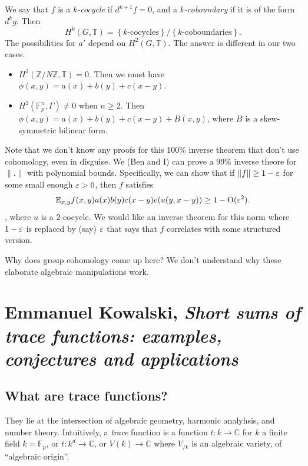 \documentclass[reqno]{amsart} 
\numberwithin{theorem}{section}
\numberwithin{equation}{section}
\begin{document}
We say that $f$ is a $k$\emph{-cocycle} if $d^{k + 1} f = 0$, and a $k$\emph{-coboundary} if it is of the form $d^k g$.  Then
\begin{equation*}
  H^k(G, \mathbb{T}) = \left\{ \text{$k$-cocycles} \right\} / \left\{\text{$k$-coboundaries} \right\}.
\end{equation*}
The possibilities for $a'$ depend on $H^2(G, \mathbb{T})$.  The answer is different in our two cases.
\begin{itemize}
\item $H^2(\mathbb{Z} / N \mathbb{Z}, \mathbb{T}) = 0$.  Then we must have $\phi(x, y) = a(x) + b(y) + c(x - y)$.
\item $H^2(\mathbb{F}_p^n, \Gamma) \neq 0$ when $n \geq 2$.  Then $\phi(x, y) = a(x) + b(y) + c(x - y) + B(x, y)$, where $B$ is a skew-symmetric bilinear form.
\end{itemize}
Note that we don't know any proofs for this 100\% inverse theorem that don't use cohomology, even in disguise.  We (Ben and I) can prove a 99\% inverse theore for $\lVert . \rVert$ with polynomial bounds.  Specifically, we can show that if $\lVert f \rVert \geq 1 - \varepsilon$ for some small enough $\varepsilon > 0$, then $f$ satisfies
\begin{equation*}
  \mathbb{E}_{x, y} f(x, y) a(x) b(y) c(x - y) e(u(y, x - y)) \geq 1 - \operatorname{O}(\varepsilon^2).
\end{equation*},
where $u$ is a $2$-cocycle.  We would like an inverse theorem for this norm where $1- \varepsilon$ is replaced by (say) $\varepsilon$ that says that $f$ correlates with some structured version.

\begin{question}
  Why does group cohomology come up here?  We don't understand why these elaborate algebraic manipulations work.
\end{question}

\section{Emmanuel Kowalski, \emph{Short sums of trace functions: examples, conjectures and applications}}

\subsection{What are trace functions?}

They lie at the intersection of algebraic geometry, harmonic analyhsis, and number theory.  Intuitively, a \emph{trace} function is a function $t : k \rightarrow \mathbb{C}$ for $k$ a finite field $k = \mathbb{F}_p$, or $t : k^d \rightarrow \mathbb{C}$, or $V(k) \rightarrow \mathbb{C}$ where $V_{/k}$ is an algebraic variety, of ``algebraic origin''.
\end{document}
